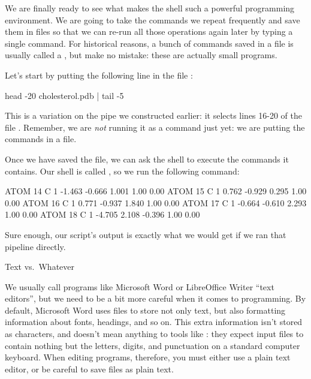 We are finally ready to see what makes the shell such a powerful
programming environment. We are going to take the commands we repeat
frequently and save them in files so that we can re-run all those
operations again later by typing a single command. For historical
reasons, a bunch of commands saved in a file is usually called a
, but make no mistake: these are
actually small programs.

Let's start by putting the following line in the file
:

\begin{VerbFile}
head -20 cholesterol.pdb | tail -5
\end{VerbFile}

This is a variation on the pipe we constructed earlier: it selects lines
16-20 of the file . Remember, we are \emph{not}
running it as a command just yet: we are putting the commands in a file.

Once we have saved the file, we can ask the shell to execute the
commands it contains. Our shell is called , so we run the
following command:


\begin{VerbOut}
ATOM     14  C           1      -1.463  -0.666   1.001  1.00  0.00
ATOM     15  C           1       0.762  -0.929   0.295  1.00  0.00
ATOM     16  C           1       0.771  -0.937   1.840  1.00  0.00
ATOM     17  C           1      -0.664  -0.610   2.293  1.00  0.00
ATOM     18  C           1      -4.705   2.108  -0.396  1.00  0.00
\end{VerbOut}

Sure enough, our script's output is exactly what we would get if we ran
that pipeline directly.

\begin{swcbox}{Text vs.\ Whatever}

We usually call programs like Microsoft Word or LibreOffice Writer
``text editors'', but we need to be a bit more careful when it comes to
programming. By default, Microsoft Word uses  files to
store not only text, but also formatting information about fonts,
headings, and so on. This extra information isn't stored as characters,
and doesn't mean anything to tools like : they expect input
files to contain nothing but the letters, digits, and punctuation on a
standard computer keyboard. When editing programs, therefore, you must
either use a plain text editor, or be careful to save files as plain
text.

\end{swcbox}

